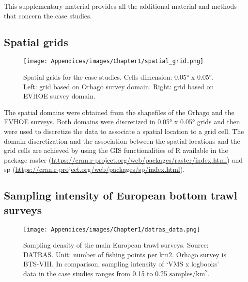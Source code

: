 This supplementary material provides all the additional material and methods that concern the case studies.

\subsection{Spatial grids}\label{appendix:SpGrid}

\begin{figure}[H]
   \begin{center}
      \texttt{[image: Appendices/images/Chapter1/spatial\_grid.png]}
   \end{center}
   \caption[Spatial grids for the case studies.]
   {Spatial grids for the case studies. Cells dimension: 0.05° x 0.05°. Left: grid based on Orhago survey domain. Right: grid based on EVHOE survey domain.}
   \label{fig:SpGrid}
\end{figure}

The spatial domains were obtained from the shapefiles of the Orhago and the EVHOE surveys. Both domains were discretized in 0.05° x 0.05° grids and then were used to discretize the data to associate a spatial location to a grid cell. The domain discretization and the association between the spatial locations and the grid cells are achieved by using the GIS functionalities of R available in the package raster (\url{https://cran.r-project.org/web/packages/raster/index.html}) and sp (\url{https://cran.r-project.org/web/packages/sp/index.html}).

\clearpage

\subsection{Sampling intensity of European bottom trawl surveys}\label{appendix:DatrasData}

\begin{figure}[H]
   \begin{center}
      \texttt{[image: Appendices/images/Chapter1/datras\_data.png]}
   \end{center}
   \caption[Sampling density of the main European trawl surveys.]
   {Sampling density of the main European trawl surveys. Source: DATRAS. Unit: number of fishing points per km2. Orhago survey is BTS-VIII. In comparison, sampling intensity of ‘VMS x logbooks’ data in the case studies ranges from 0.15 to 0.25 \(\text{samples}/\text{km}^2\).}
   \label{fig:DatrasData}
\end{figure}

